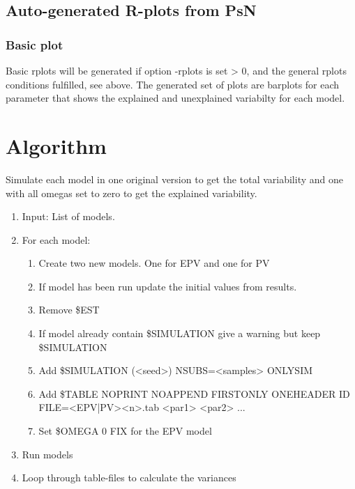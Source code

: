 \subsection{Auto-generated R-plots from PsN}
\newcommand{\rplotsconditions}{The default pvar template 
requires no extra R libraries.}


\subsubsection*{Basic plot}
Basic rplots will be generated if option -rplots is set > 0,
and the general rplots conditions fulfilled, see above.
The generated set of plots are barplots for each parameter
that shows the explained and unexplained variabilty for each
model.


\section{Algorithm}

Simulate each model in one original version to get the total variability and one with all omegas set to zero to get the explained variability.

\begin{enumerate}
	\item Input: List of models.
	\item For each model:
	\begin{enumerate}
		\item Create two new models. One for EPV and one for PV
		\item If model has been run update the initial values from results.
		\item Remove \$EST
		\item If model already contain \$SIMULATION give a warning but keep \$SIMULATION
		\item Add \$SIMULATION (<seed>) NSUBS=<samples> ONLYSIM
		\item Add \$TABLE NOPRINT NOAPPEND FIRSTONLY ONEHEADER ID FILE=<EPV|PV><n>.tab <par1> <par2> ...
		\item Set \$OMEGA 0 FIX for the EPV model
	\end{enumerate}
	\item Run models
	\item Loop through table-files to calculate the variances
\end{enumerate}

{}



